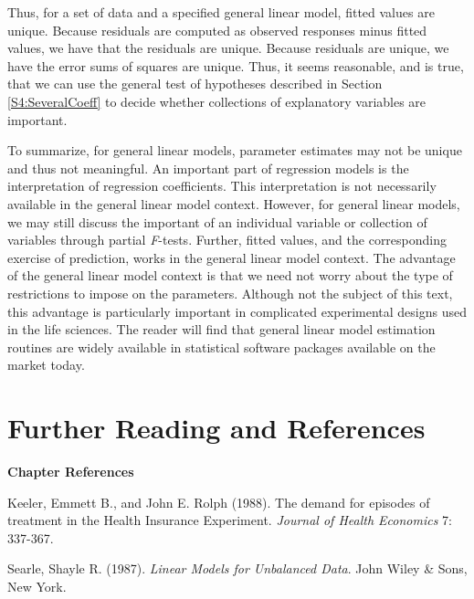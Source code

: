 Thus, for a set of data and a specified general linear model, fitted
values are unique. Because residuals are computed as observed
responses minus fitted values, we have that the residuals are
unique. Because residuals are unique, we have the error sums of
squares are unique. Thus, it seems reasonable, and is true, that we
can use the general test of hypotheses described in Section
\ref{S4:SeveralCoeff} to decide whether collections of explanatory
variables are important.

To summarize, for general linear models, parameter estimates may not
be unique and thus not meaningful. An important part of regression
models is the interpretation of regression coefficients. This
interpretation is not necessarily available in the general linear
model context. However, for general linear models, we may still
discuss the important of an individual variable or collection of
variables through partial \textit{F}-tests. Further, fitted values,
and the corresponding exercise of prediction, works in the general
linear model context. The advantage of the general linear model
context is that we need not worry about the type of restrictions to
impose on the parameters. Although not the subject of this text,
this advantage is particularly important in complicated experimental
designs used in the life sciences. The reader will find that general
linear model estimation routines are widely available in statistical
software packages available on the market today.



\section{Further Reading and References}


\textbf{Chapter References}

\begin{multicols}{2}


Keeler, Emmett B., and  John E. Rolph (1988). The demand for
episodes of treatment in the Health Insurance Experiment.
\emph{Journal of Health Economics} 7: 337-367.

Searle, Shayle R. (1987). \textit{Linear Models for Unbalanced
Data}. John Wiley \& Sons, New York.



\end{multicols}

\bigskip


